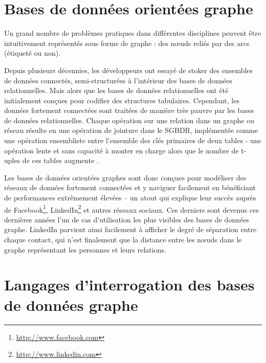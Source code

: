 \newpage
\section{Bases de données orientées graphe}
\label{sec:graph-database-overview}
Un grand nombre de problèmes pratiques dans différentes disciplines
peuvent être intuitivement représentés sous forme de graphe : des
nœuds reliés par des arcs (étiqueté ou non).

Depuis plusieurs décennies, les développeurs ont essayé de stoker des
ensembles de données connectés, semi-structurées à l'intérieur des
bases de données relationnelles. Mais alors que les bases de données
relationnelles ont été initialement conçues pour codifier des
structures tabulaires. Cependant, les données fortement connectées
sont traitées de manière très pauvre par les bases de données
relationnelles. Chaque opération sur une relation dans un graphe ou
réseau résulte en une opération de jointure dans le \acrshort{SGBDR},
implémentée comme une opération ensembliste entre l'ensemble des clés
primaires de deux tables - une opération lente et sans capacité à
monter en charge alors que le nombre de t-uples de ces tables augmente
\cite{robinson2013graph}.

Les bases de données orientées graphes sont donc conçues pour
modéliser des réseaux de données fortement connectées et y naviguer
facilement en bénéficiant de performances extrêmement élevées – un
atout qui explique leur succès auprès de
Facebook\footnote{\url{http://www.facebook.com}},
LinkedIn\footnote{\url{http://www.linkedin.com}} et autres réseaux
sociaux. Ces derniers sont devenus ces dernières années l'un de cas
d'utilisation les plus visibles des bases de données graphe.  LinkedIn
parvient ainsi facilement à afficher le degré de séparation entre
chaque contact, qui n'est finalement que la distance entre les nœuds
dans le graphe représentant les personnes et leurs relations.

\section{Langages d'interrogation des bases de données graphe}
\label{query-languages}

